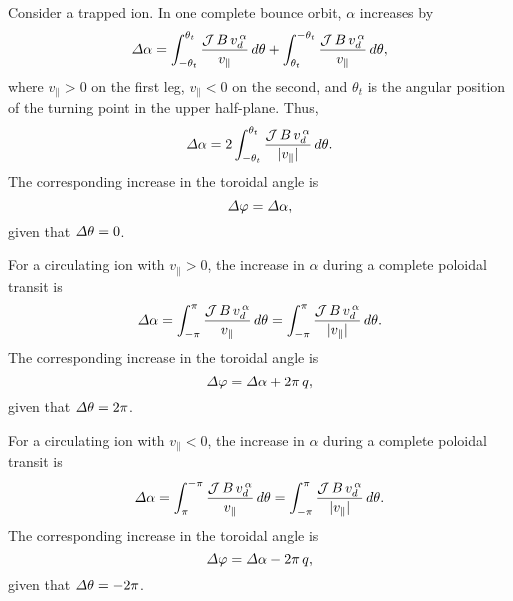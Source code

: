 \documentclass[12pt,prb,aps,notitlepage]{revtex4-1}
\begin{document}
 Consider a trapped ion. 
 In one complete bounce orbit, $\alpha$ increases by
 \begin{equation}
 {\mit\Delta}\alpha =\int_{-\theta_t}^{\theta_t} \frac{{\cal J}\,B\,v_d^{\,\alpha}}{v_\parallel}\,d\theta + \int_{\theta_t}^{-\theta_t} 
  \frac{{\cal J}\,B\,v_d^{\,\alpha}}{v_\parallel}\,d\theta,
 \end{equation}
 where $v_\parallel>0$ on the first leg,  $v_\parallel<0$ on the second,  and $\theta_t$ is the angular position of the turning point in the upper half-plane.
 Thus,
 \begin{equation}
 {\mit\Delta}\alpha =2\int_{-\theta_t}^{\theta_t} \frac{{\cal J}\,B\,v_d^{\,\alpha}}{|v_\parallel|}\,d\theta.
 \end{equation}
 The corresponding increase in the toroidal angle is
 \begin{equation}
 {\mit\Delta}\varphi = {\mit\Delta}\alpha,
 \end{equation}
 given that ${\mit\Delta}\theta=0$. 
 
 For a circulating ion with $v_\parallel>0$, the increase in $\alpha$ during a complete poloidal transit is
 \begin{equation}
 {\mit\Delta}\alpha =\int_{-\pi}^{\pi} \frac{{\cal J}\,B\,v_d^{\,\alpha}}{v_\parallel}\,d\theta = \int_{-\pi}^{\pi} \frac{{\cal J}\,B\,v_d^{\,\alpha}}{|v_\parallel|}\,d\theta.
 \end{equation}
The corresponding increase in the toroidal angle is
\begin{equation}
 {\mit\Delta}\varphi = {\mit\Delta}\alpha+ 2\pi\,q,
 \end{equation}
 given that ${\mit\Delta}\theta=2\pi$. 
 
 For a circulating ion with $v_\parallel<0$, the increase in $\alpha$ during a complete poloidal transit is
 \begin{equation}
 {\mit\Delta}\alpha =\int_\pi^{-\pi} \frac{{\cal J}\,B\,v_d^{\,\alpha}}{v_\parallel}\,d\theta = \int_{-\pi}^{\pi} \frac{{\cal J}\,B\,v_d^{\,\alpha}}{|v_\parallel|}\,d\theta.
 \end{equation}
The corresponding increase in the toroidal angle is
\begin{equation}
 {\mit\Delta}\varphi = {\mit\Delta}\alpha- 2\pi\,q,
 \end{equation}
 given that ${\mit\Delta}\theta=-2\pi$. 
  
\end{document}
